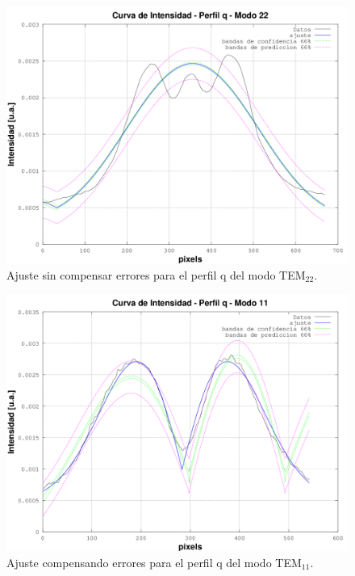 \documentclass[10pt, a4paper]{article}%
\begin{document}
\begin{multicols}{2}
\begin{figure}[H]
    \centering    
    \includegraphics[scale=0.35]{Graficos/plt_ajuste_tem22_perfil_q.png}
    \caption{Ajuste sin compensar errores para el perfil q del modo TEM$_{22}$.}
    \label{fig:ajuste_malo_modo_tem22}
\end{figure}
\begin{figure}[H]
    \centering    
    \includegraphics[scale=0.35]{Graficos/plt_ajuste_tem11_perfil_q.png}
    \caption{Ajuste compensando errores para el perfil q del modo TEM$_{11}$.}
    \label{fig:ajuste_bueno_modo_tem11}
\end{figure}
\begin{figure}[H]
    \centering    

\end{figure}
\end{multicols}
\end{document}
